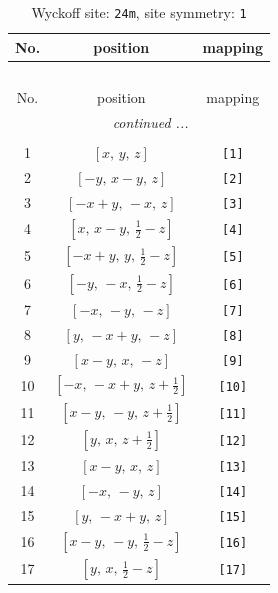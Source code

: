 \documentclass[fleqn,8pt]{jsarticle}
\begin{document}
\begin{longtable}{ccc}
\caption{Wyckoff site: {\tt 24m}, site symmetry: {\tt 1}}
 \\
 \hline \hline
No. & position & mapping \\ \hline \endfirsthead

\multicolumn{2}{l}{\tablename\ \thetable{}} \\
 \hline \hline
No. & position & mapping \\ \hline \endhead

 \hline \hline
\multicolumn{2}{r}{\footnotesize\it continued ...} \\ \endfoot

 \hline \hline
\multicolumn{2}{r}{} \\ \endlastfoot

1 & $\left[ x,\, y,\, z \right]$ & {\tt [1]} \\ \hline
2 & $\left[ - y,\, x - y,\, z \right]$ & {\tt [2]} \\ \hline
3 & $\left[ - x + y,\, - x,\, z \right]$ & {\tt [3]} \\ \hline
4 & $\left[ x,\, x - y,\, \frac{1}{2} - z \right]$ & {\tt [4]} \\ \hline
5 & $\left[ - x + y,\, y,\, \frac{1}{2} - z \right]$ & {\tt [5]} \\ \hline
6 & $\left[ - y,\, - x,\, \frac{1}{2} - z \right]$ & {\tt [6]} \\ \hline
7 & $\left[ - x,\, - y,\, - z \right]$ & {\tt [7]} \\ \hline
8 & $\left[ y,\, - x + y,\, - z \right]$ & {\tt [8]} \\ \hline
9 & $\left[ x - y,\, x,\, - z \right]$ & {\tt [9]} \\ \hline
10 & $\left[ - x,\, - x + y,\, z + \frac{1}{2} \right]$ & {\tt [10]} \\ \hline
11 & $\left[ x - y,\, - y,\, z + \frac{1}{2} \right]$ & {\tt [11]} \\ \hline
12 & $\left[ y,\, x,\, z + \frac{1}{2} \right]$ & {\tt [12]} \\ \hline
13 & $\left[ x - y,\, x,\, z \right]$ & {\tt [13]} \\ \hline
14 & $\left[ - x,\, - y,\, z \right]$ & {\tt [14]} \\ \hline
15 & $\left[ y,\, - x + y,\, z \right]$ & {\tt [15]} \\ \hline
16 & $\left[ x - y,\, - y,\, \frac{1}{2} - z \right]$ & {\tt [16]} \\ \hline
17 & $\left[ y,\, x,\, \frac{1}{2} - z \right]$ & {\tt [17]} \\ \hline

\end{longtable}
\end{document}
